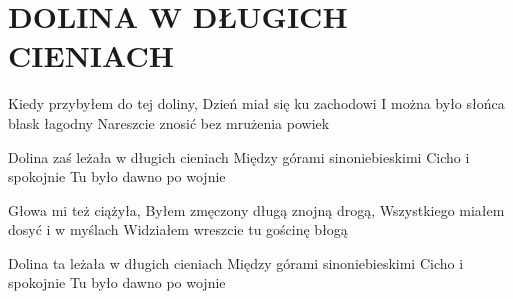 \documentclass[../../../songbook.tex]{subfiles}
\begin{document}
\TabPositions{8cm} %
\section*{DOLINA W DŁUGICH CIENIACH}
{}
\vspace{0.5cm}
Kiedy przybyłem do tej doliny,			 \newline
Dzień miał się ku zachodowi				 \newline
I można było słońca blask łagodny		 \newline
Nareszcie znosić bez mrużenia powiek	 \newline

\-\hspace{1cm} Dolina zaś leżała w długich cieniach		 \newline
\-\hspace{1cm} Między górami sinoniebieskimi			 \newline
\-\hspace{1cm} Cicho i spokojnie 						 \newline
\-\hspace{1cm} Tu było dawno po wojnie					 \newline

Głowa mi też ciążyła,			\newline
Byłem zmęczony długą znojną drogą,			\newline
Wszystkiego miałem dosyć i w myślach			\newline
Widziałem wreszcie tu gościnę błogą			\newline

\-\hspace{1cm} Dolina ta leżała w długich cieniach			\newline
\-\hspace{1cm} Między górami sinoniebieskimi			\newline
\-\hspace{1cm} Cicho i spokojnie 			\newline
\-\hspace{1cm} Tu było dawno po wojnie			\newline
\end{document}
